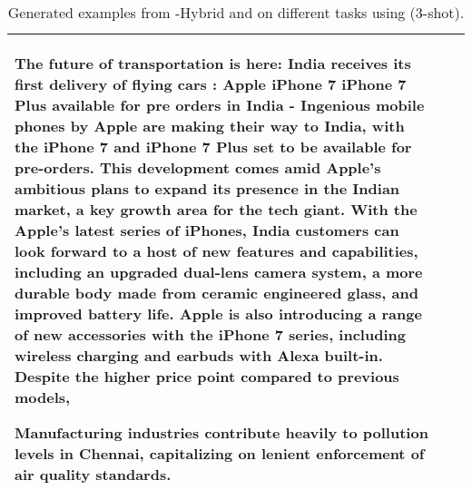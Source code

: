 \begin{table*}[!t]
{\begin{tabular}{C{0.08\textwidth}C{0.06\textwidth}p{0.84\textwidth}}
 The future of transportation is here: India receives its first delivery of flying cars : Apple iPhone 7 iPhone 7 Plus available for pre orders in India - Ingenious mobile phones by Apple are making their way to India, with the iPhone 7 and iPhone 7 Plus set to be available for pre-orders. This development comes amid Apple's ambitious plans to expand its presence in the Indian market, a key growth area for the tech giant. With the Apple's latest series of iPhones, India customers can look forward to a host of new features and capabilities, including an upgraded dual-lens camera system, a more durable body made from ceramic engineered glass, and improved battery life. Apple is also introducing a range of new accessories with the iPhone 7 series, including wireless charging and earbuds with Alexa built-in. Despite the higher price point compared to previous models,

 Manufacturing industries contribute heavily to pollution levels in Chennai, capitalizing on lenient enforcement of air quality standards.
\\ \bottomrule
\end{tabular}
\vspace{-1ex}
}
\caption{
Generated examples from \corrsyn-Hybrid and \fewgen{} on different tasks using \PhiMini{} (3-shot).
}
\vspace{-3ex}
\label{tab:cfg-vs-corr-generations}
\end{table*}